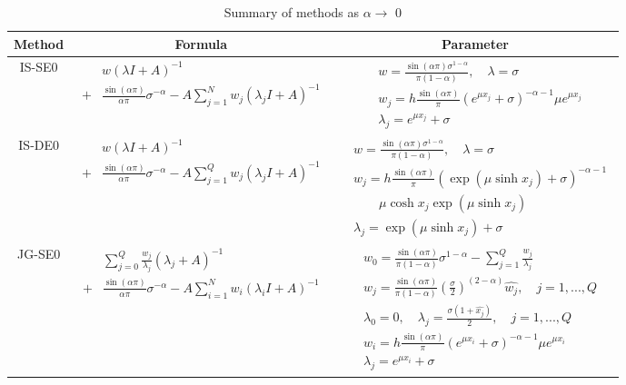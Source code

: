 \begin{table}[htbp]
	\centering
	\caption{Summary of  methods as $\alpha \rightarrow$ 0 }\label{TAB_SEDE0}
	\begin{tabular}
		{c|c|c}
		\toprule
		\textbf{Method}   &  \textbf{Formula}  & \textbf{Parameter}\\
		\hline
		IS-SE0       & $\begin{aligned}&w(\lambda I+A)^{-1}\\+&\frac{\sin(\alpha \pi)}{\alpha\pi}\sigma^{-\alpha}-A\sum_{j=1}^{N} w_j(\lambda_j I+ A)^{-1}\end{aligned}$& $\begin{aligned}&w=\frac{\sin(\alpha \pi)\sigma^{1-\alpha}}{\pi (1-\alpha)},\quad \lambda=\sigma\\& w_j=h\frac{\sin(\alpha \pi)}{\pi}(e^{\mu x_j}+\sigma)^{-\alpha-1}\mu e^{\mu x_j}\\& \lambda_j=e^{\mu x_j}+\sigma\end{aligned}$\\
		\hline
		IS-DE0  &$\begin{aligned}&w(\lambda I+A)^{-1}\\+&\frac{\sin(\alpha \pi)}{\alpha\pi}\sigma^{-\alpha}-A\sum_{j=1}^{Q} w_j(\lambda_j I+ A)^{-1}\end{aligned}$ & $\begin{aligned}&w=\frac{\sin(\alpha \pi)\sigma^{1-\alpha}}{\pi (1-\alpha)},\quad \lambda=\sigma\\& w_j=h\frac{\sin(\alpha\pi)}{\pi}(\exp(\mu\sinh x_j)+\sigma)^{-\alpha-1}\\&\qquad \mu\cosh x_j\exp(\mu\sinh x_j)\\& \lambda_j=\exp(\mu\sinh x_j)+\sigma\end{aligned}$\\
		\hline
		JG-SE0 & $\begin{aligned}&\sum_{j=0}^{Q}\frac{w_j}{\lambda_j}(\lambda_j+A)^{-1}\\+&\frac{\sin(\alpha \pi)}{\alpha\pi}\sigma^{-\alpha}-A\sum_{i=1}^{N} w_i(\lambda_i I+ A)^{-1}\end{aligned}$ & $\begin{aligned}& w_0=\frac{\sin(\alpha \pi)}{\pi(1-\alpha)}\sigma^{1-\alpha}-\sum_{j=1}^{Q}\frac{w_j}{\lambda_j}\\& w_j=\frac{\sin(\alpha \pi)}{\pi(1-\alpha)}\left(\frac{\sigma}{2}\right)^{(2-\alpha)}\hat{w_j},\quad j=1,...,Q\\& \lambda_0=0,\quad \lambda_j=\frac{\sigma(1+\hat{x_j})}{2},\quad j=1,...,Q \\& w_i=h\frac{\sin(\alpha \pi)}{\pi}(e^{\mu x_i}+\sigma)^{-\alpha-1}\mu e^{\mu x_i}\\& \lambda_j=e^{\mu x_i}+\sigma\end{aligned}$\\

\end{tabular}
\end{table}
